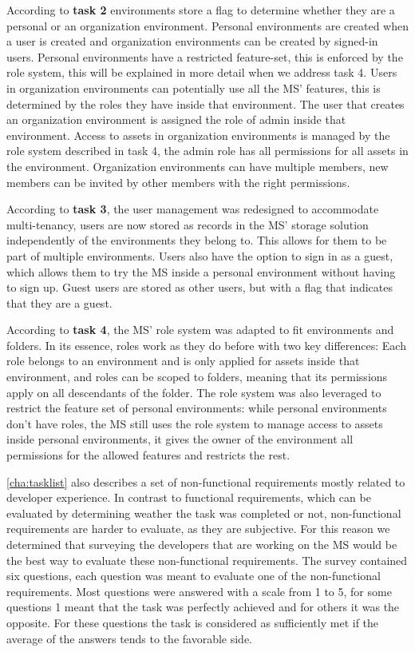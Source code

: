 According to \textbf{task 2} environments store a flag to determine whether they are a
personal or an organization environment.
Personal environments are created when a user is created and organization environments can
be created by signed-in users.
Personal environments have a restricted feature-set, this is enforced by the role
system, this will be explained in more detail when we address task 4.
Users in organization environments can potentially use all the MS' features, this is
determined by the roles they have inside that environment.
The user that creates an organization environment is assigned the role of admin inside
that environment.
Access to assets in organization environments is managed by the role system described in
task 4,
the admin role has all permissions for all assets in the environment.
Organization environments can have multiple members, new members can be invited by other
members with the right permissions.

According to \textbf{task 3}, the user management was redesigned to accommodate
multi-tenancy,
users are now stored as records in the MS' storage solution independently of the environments they belong to.
This allows for them to be part of multiple environments.
Users also have the option to sign in as a guest, which allows them to try the MS inside
a personal environment without having to sign up.
Guest users are stored as other users, but with a flag that indicates that they are a
guest.

According to \textbf{task 4}, the MS' role system was adapted to fit environments and
folders. In its essence, roles work as they do before with two key differences:
Each role belongs to an environment and is only applied for assets inside that
environment, and roles can be scoped to folders, meaning that its permissions apply on all
descendants of the folder.
The role system was also leveraged to restrict the feature set of personal environments:
while personal environments don't have roles, the MS still uses the role system to manage
access to assets inside personal environments, it gives the owner of the environment all
permissions for the allowed features and restricts the rest.

\ref{cha:tasklist} also describes a set of non-functional requirements mostly related to
developer experience.
In contrast to functional requirements, which can be evaluated by determining weather the
task was completed or not,
non-functional requirements are harder to evaluate, as they are subjective.
For this reason we determined that surveying the developers that are working on the MS
would be the best way to evaluate these non-functional requirements.
The survey contained six questions, each question was meant to evaluate one of the
non-functional requirements.
Most questions were answered with a scale from 1 to 5, for some questions 1 meant that the
task was perfectly achieved and for others it was the opposite.
For these questions the task is considered as sufficiently met if the average of the
answers tends to the favorable side.

